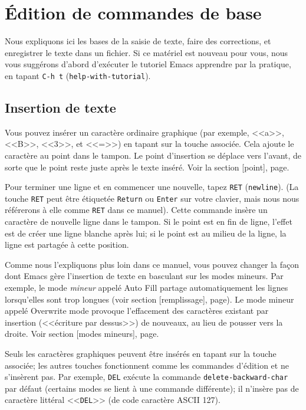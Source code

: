 \chapter{\'Edition de commandes de base}
Nous expliquons ici les bases de la saisie de texte, faire des
corrections, et enregistrer le texte dans un fichier. Si ce matériel
est nouveau pour vous, nous vous suggérons d'abord d'exécuter le tutoriel Emacs
apprendre par la pratique, en tapant \texttt{C-h t}
(\texttt{help-with-tutorial}). \par

\section{Insertion de texte}
Vous pouvez insérer un caractère ordinaire graphique (par exemple,
<<a>>, <<B>>, <<3>>, et <<=>>) en tapant sur la touche associée. Cela
ajoute le caractère au point dans le tampon. Le point d'insertion se
déplace vers l'avant, de sorte que le point reste juste après le
texte inséré. Voir la section [point],
page. \par

Pour terminer une ligne et en commencer une nouvelle, tapez \texttt{RET}
(\texttt{newline}). (La touche \texttt{RET} peut être étiquetée
\texttt{Return} ou \texttt{Enter} sur votre clavier, mais nous nous
référerons à elle comme \texttt{RET} dans ce manuel). Cette commande
insère un caractère de nouvelle ligne dans le tampon. Si le point est
en fin de ligne, l'effet est de créer une ligne blanche après lui; si
le point est au milieu de la ligne, la ligne est partagée à cette
position.\par

Comme nous l'expliquons plus loin dans ce manuel, vous pouvez changer
la façon dont Emacs gère l'insertion de texte en basculant sur les
modes mineurs. Par exemple, le mode \emph{mineur} appelé Auto Fill
partage automatiquement les lignes lorsqu'elles sont trop longues
(voir section [remplissage],
page). Le mode mineur appelé Overwrite mode
provoque l'effacement des caractères existant par insertion (<<écriture par
dessus>>) de nouveaux, au lieu de pousser vers la droite. Voir
section [modes mineurs],
page.\par 

Seuls les caractères graphiques peuvent être insérés en tapant sur la
touche associée; les autres touches fonctionnent comme les commandes
d'édition et ne s'insèrent pas. Par exemple, \texttt{DEL} exécute la
commande \texttt{delete-backward-char} par défaut (certains modes se
lient à une commande différente); il n'insère pas de caractère
littéral <<\texttt{DEL}>> (de code caractère ASCII 127). \par


